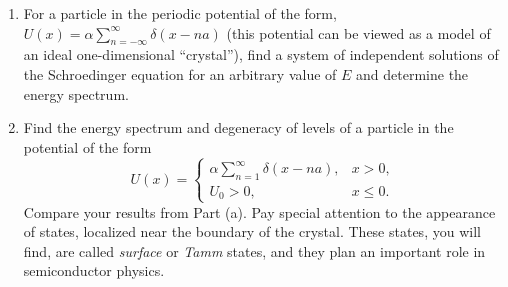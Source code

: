 \documentclass{jhwhw}
\begin{document}
\begin{enumerate}
\item For a particle in the periodic potential of the form, $U(x) = \alpha \sum_{n=-\infty}^{\infty} \delta(x - n a)$ (this potential can be viewed as a model of an ideal one-dimensional ``crystal''), find a system of independent solutions of the Schroedinger equation for an arbitrary value of $E$ and determine the energy spectrum.
  \item Find the energy spectrum and degeneracy of levels of a particle in the potential of the form
        \begin{equation}
          \label{eq:5}
          U(x) =
          \begin{cases}
            \alpha \sum_{n=1}^{\infty} \delta(x - na), & x>0,\\
            U_{0}>0, & x\leq 0.
          \end{cases}
        \end{equation}
    Compare your results from Part (a). Pay special attention to the appearance of states, localized near the boundary of the crystal. These states, you will find, are called \emph{surface} or \emph{Tamm} states, and they plan an important role in semiconductor physics.
\end{enumerate}
\end{document}
